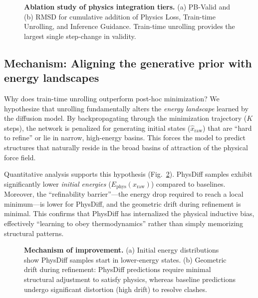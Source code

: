 \documentclass[twocolumn,10pt]{article}
\newcommand{\modelname}{PhysDiff}
\begin{document}
\begin{figure}[t]
    \centering
    \caption{\textbf{Ablation study of physics integration tiers.}
    (a) PB-Valid and (b) RMSD for cumulative addition of Physics Loss, Train-time Unrolling, and Inference Guidance.
    Train-time unrolling provides the largest single step-change in validity.
    }
    \label{fig:ablation}
\end{figure}

\subsection{Mechanism: Aligning the generative prior with energy landscapes}
Why does train-time unrolling outperform post-hoc minimization? We hypothesize that unrolling fundamentally alters the \emph{energy landscape} learned by the diffusion model.
By backpropagating through the minimization trajectory ($K$ steps), the network is penalized for generating initial states ($\hat{x}_{\mathrm{raw}}$) that are ``hard to refine'' or lie in narrow, high-energy basins.
This forces the model to predict structures that naturally reside in the broad basins of attraction of the physical force field.

Quantitative analysis supports this hypothesis (Fig.~\ref{fig:mechanism_main}). \modelname{} samples exhibit significantly lower \emph{initial energies} ($E_{\mathrm{phys}}(x_{\mathrm{raw}})$) compared to baselines.
Moreover, the ``refinability barrier''---the energy drop required to reach a local minimum---is lower for \modelname{}, and the geometric drift during refinement is minimal.
This confirms that \modelname{} has internalized the physical inductive bias, effectively ``learning to obey thermodynamics'' rather than simply memorizing structural patterns.

\begin{figure}[t]
    \centering
    \caption{\textbf{Mechanism of improvement.}
    (a) Initial energy distributions show \modelname{} samples start in lower-energy states.
    (b) Geometric drift during refinement: \modelname{} predictions require minimal structural adjustment to satisfy physics, whereas baseline predictions undergo significant distortion (high drift) to resolve clashes.
    }
    \label{fig:mechanism_main}
\end{figure}
\end{document}
